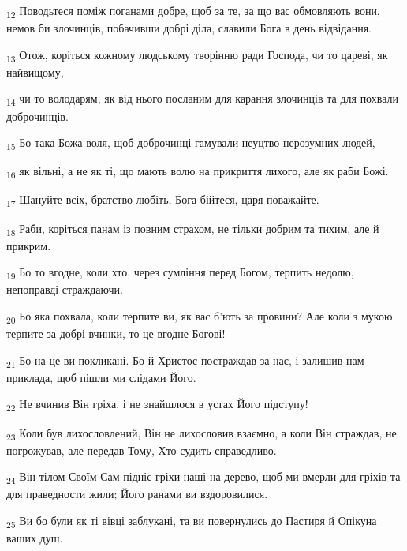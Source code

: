 \begin{tcolorbox}
\textsubscript{12} Поводьтеся поміж поганами добре, щоб за те, за що вас обмовляють вони, немов би злочинців, побачивши добрі діла, славили Бога в день відвідання.
\end{tcolorbox}
\begin{tcolorbox}
\textsubscript{13} Отож, коріться кожному людському творінню ради Господа, чи то цареві, як найвищому,
\end{tcolorbox}
\begin{tcolorbox}
\textsubscript{14} чи то володарям, як від нього посланим для карання злочинців та для похвали доброчинців.
\end{tcolorbox}
\begin{tcolorbox}
\textsubscript{15} Бо така Божа воля, щоб доброчинці гамували неуцтво нерозумних людей,
\end{tcolorbox}
\begin{tcolorbox}
\textsubscript{16} як вільні, а не як ті, що мають волю на прикриття лихого, але як раби Божі.
\end{tcolorbox}
\begin{tcolorbox}
\textsubscript{17} Шануйте всіх, братство любіть, Бога бійтеся, царя поважайте.
\end{tcolorbox}
\begin{tcolorbox}
\textsubscript{18} Раби, коріться панам із повним страхом, не тільки добрим та тихим, але й прикрим.
\end{tcolorbox}
\begin{tcolorbox}
\textsubscript{19} Бо то вгодне, коли хто, через сумління перед Богом, терпить недолю, непоправді страждаючи.
\end{tcolorbox}
\begin{tcolorbox}
\textsubscript{20} Бо яка похвала, коли терпите ви, як вас б'ють за провини? Але коли з мукою терпите за добрі вчинки, то це вгодне Богові!
\end{tcolorbox}
\begin{tcolorbox}
\textsubscript{21} Бо на це ви покликані. Бо й Христос постраждав за нас, і залишив нам приклада, щоб пішли ми слідами Його.
\end{tcolorbox}
\begin{tcolorbox}
\textsubscript{22} Не вчинив Він гріха, і не знайшлося в устах Його підступу!
\end{tcolorbox}
\begin{tcolorbox}
\textsubscript{23} Коли був лихословлений, Він не лихословив взаємно, а коли Він страждав, не погрожував, але передав Тому, Хто судить справедливо.
\end{tcolorbox}
\begin{tcolorbox}
\textsubscript{24} Він тілом Своїм Сам підніс гріхи наші на дерево, щоб ми вмерли для гріхів та для праведности жили; Його ранами ви вздоровилися.
\end{tcolorbox}
\begin{tcolorbox}
\textsubscript{25} Ви бо були як ті вівці заблукані, та ви повернулись до Пастиря й Опікуна ваших душ.
\end{tcolorbox}
